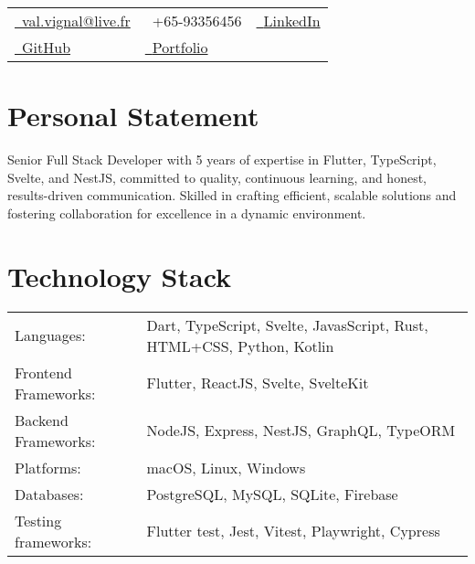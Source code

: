 \documentclass[a4paper,11pt]{article}
\makeatletter
\newcommand{\email}{val.vignal@live.fr}
\makeatother
\begin{document}

\par{\bigskip\par}


\begin{tabularx}{\textwidth}{X X X}
  \href{mailto:\email}{\raisebox{0.0\height}{\footnotesize \faEnvelope}\ {\email}}                   & {\raisebox{0.0\height}{\footnotesize \faPhone}\ +65-93356456}                                                  & \href{https://www.linkedin.com/in/valentin-vignal/}{\raisebox{0.0\height}{\footnotesize \faLinkedin}\ {LinkedIn}} \\
  \href{https://github.com/ValentinVignal}{\raisebox{0.0\height}{\footnotesize \faGithub}\ {GitHub}} & \href{https://valentinvignal.github.io/portfolio/}{\raisebox{0.0\height}{\footnotesize \faGlobe}\ {Portfolio}}                                                                                                                     \\
\end{tabularx}


\section{\textbf{Personal Statement}}
Senior Full Stack Developer with 5 years
of expertise in Flutter, TypeScript, Svelte, and NestJS, committed to quality, continuous
learning, and honest, results-driven communication. Skilled in crafting
efficient, scalable solutions and fostering collaboration for excellence in a
dynamic environment.


\section{\textbf{Technology Stack}}

\begin{tabular}{@{}l l}
  Languages:           & Dart, TypeScript, Svelte, JavasScript, Rust, HTML+CSS, Python, Kotlin \\
  Frontend Frameworks: & Flutter, ReactJS, Svelte, SvelteKit                                   \\
  Backend Frameworks:  & NodeJS, Express, NestJS, GraphQL, TypeORM                             \\
  Platforms:           & macOS, Linux, Windows                                                 \\
  Databases:           & PostgreSQL, MySQL, SQLite, Firebase                                   \\
  Testing frameworks:  & Flutter test, Jest, Vitest, Playwright, Cypress                       \\
\end{tabular}
\end{document}
